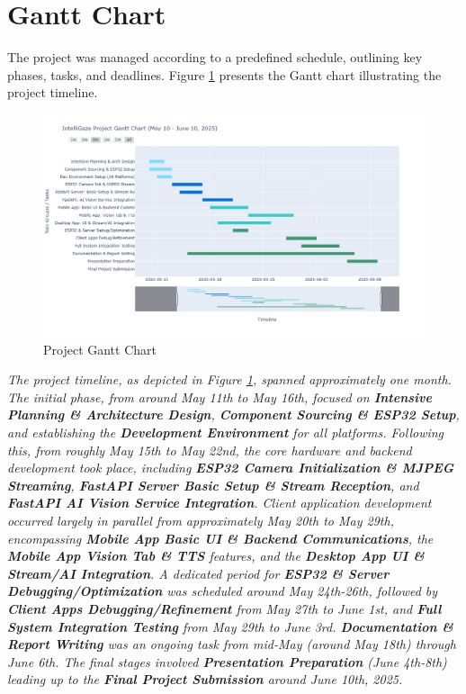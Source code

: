 \documentclass[12pt, a4paper]{report}
\begin{document}
\section{Gantt Chart}
The project was managed according to a predefined schedule, outlining key phases, tasks, and deadlines. Figure \ref{fig:gantt_chart} presents the Gantt chart illustrating the project timeline.
\begin{figure}[H]
    \centering
    \includegraphics[height=0.85\textwidth, angle=90]{fig/gantt_chart.png}
    \caption{Project Gantt Chart}
    \label{fig:gantt_chart}
\end{figure}


\textit{The project timeline, as depicted in Figure \ref{fig:gantt_chart}, spanned approximately one month. The initial phase, from around May 11th to May 16th, focused on \textbf{Intensive Planning \& Architecture Design}, \textbf{Component Sourcing \& ESP32 Setup}, and establishing the \textbf{Development Environment} for all platforms.
Following this, from roughly May 15th to May 22nd, the core hardware and backend development took place, including \textbf{ESP32 Camera Initialization \& MJPEG Streaming}, \textbf{FastAPI Server Basic Setup \& Stream Reception}, and \textbf{FastAPI AI Vision Service Integration}.
Client application development occurred largely in parallel from approximately May 20th to May 29th, encompassing \textbf{Mobile App Basic UI \& Backend Communications}, the \textbf{Mobile App Vision Tab \& TTS} features, and the \textbf{Desktop App UI \& Stream/AI Integration}.
A dedicated period for \textbf{ESP32 \& Server Debugging/Optimization} was scheduled around May 24th-26th, followed by \textbf{Client Apps Debugging/Refinement} from May 27th to June 1st, and \textbf{Full System Integration Testing} from May 29th to June 3rd.
\textbf{Documentation \& Report Writing} was an ongoing task from mid-May (around May 18th) through June 6th. The final stages involved \textbf{Presentation Preparation} (June 4th-8th) leading up to the \textbf{Final Project Submission} around June 10th, 2025.}
\end{document}
